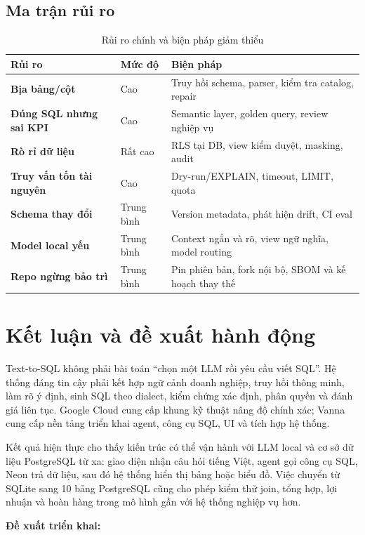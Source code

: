 \documentclass[12pt,a4paper]{article}
\begin{document}
\subsection{Ma trận rủi ro}

\begin{table}[H]
\centering
\caption{Rủi ro chính và biện pháp giảm thiểu}
\begin{tabularx}{\textwidth}{>{\bfseries}p{3.1cm}p{2.0cm}X}
\toprule
Rủi ro & Mức độ & Biện pháp\\
\midrule
Bịa bảng/cột & Cao & Truy hồi schema, parser, kiểm tra catalog, repair\\
Đúng SQL nhưng sai KPI & Cao & Semantic layer, golden query, review nghiệp vụ\\
Rò rỉ dữ liệu & Rất cao & RLS tại DB, view kiểm duyệt, masking, audit\\
Truy vấn tốn tài nguyên & Cao & Dry-run/EXPLAIN, timeout, LIMIT, quota\\
Schema thay đổi & Trung bình & Version metadata, phát hiện drift, CI eval\\
Model local yếu & Trung bình & Context ngắn và rõ, view ngữ nghĩa, model routing\\
Repo ngừng bảo trì & Trung bình & Pin phiên bản, fork nội bộ, SBOM và kế hoạch thay thế\\
\bottomrule
\end{tabularx}
\end{table}

\section{Kết luận và đề xuất hành động}

Text-to-SQL không phải bài toán ``chọn một LLM rồi yêu cầu viết SQL''. Hệ
thống đáng tin cậy phải kết hợp ngữ cảnh doanh nghiệp, truy hồi thông minh,
làm rõ ý định, sinh SQL theo dialect, kiểm chứng xác định, phân quyền và đánh
giá liên tục. Google Cloud cung cấp khung kỹ thuật nâng độ chính xác; Vanna
cung cấp nền tảng triển khai agent, công cụ SQL, UI và tích hợp hệ thống.

Kết quả hiện thực cho thấy kiến trúc có thể vận hành với LLM local và cơ sở
dữ liệu PostgreSQL từ xa: giao diện nhận câu hỏi tiếng Việt, agent gọi công cụ
SQL, Neon trả dữ liệu, sau đó hệ thống hiển thị bảng hoặc biểu đồ. Việc chuyển
từ SQLite sang 10 bảng PostgreSQL cũng cho phép kiểm thử join, tổng hợp, lợi
nhuận và hoàn hàng trong mô hình gần với hệ thống nghiệp vụ hơn.

\textbf{Đề xuất triển khai:}
\end{document}
